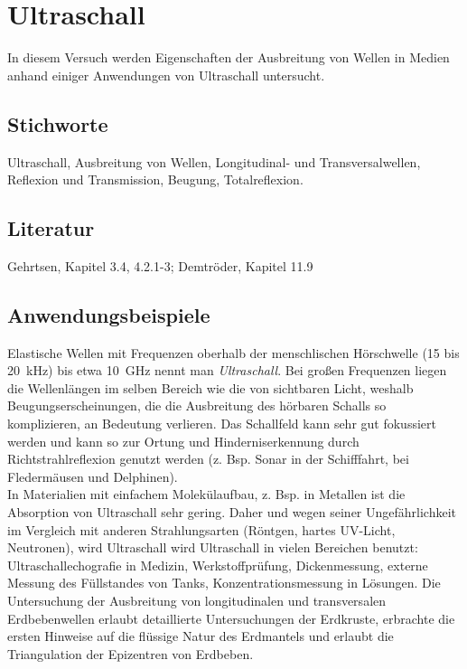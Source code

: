 \chapter{Ultraschall}
\label{vn:2}

In diesem Versuch werden Eigenschaften der Ausbreitung von Wellen in Medien anhand einiger Anwendungen von Ultraschall untersucht.
%
\section{Stichworte}
Ultraschall, Ausbreitung von Wellen, Longitudinal- und Transversalwellen, Reflexion und Transmission, Beugung, Totalreflexion.
%
\section{Literatur}
Gehrtsen, Kapitel 3.4, 4.2.1-3; Demtröder, Kapitel 11.9
%
\section{Anwendungsbeispiele}
%
Elastische Wellen mit Frequenzen oberhalb der menschlischen Hörschwelle (15 bis 20~kHz) bis etwa 10~GHz nennt man \textit{Ultraschall}. Bei großen Frequenzen liegen die Wellenlängen im selben Bereich wie die von sichtbaren Licht, weshalb Beugungserscheinungen, die die Ausbreitung des hörbaren Schalls so komplizieren, an Bedeutung verlieren. Das Schallfeld kann sehr gut fokussiert werden und kann so zur Ortung und Hinderniserkennung durch Richtstrahlreflexion genutzt werden (z. Bsp. Sonar in der Schifffahrt, bei Fledermäusen und Delphinen). \\
In Materialien mit einfachem Molekülaufbau, z. Bsp. in Metallen ist die Absorption von Ultraschall sehr gering. Daher und wegen seiner Ungefährlichkeit im Vergleich mit anderen Strahlungsarten (Röntgen, hartes UV-Licht, Neutronen), wird Ultraschall wird Ultraschall in vielen Bereichen benutzt: Ultraschallechografie in Medizin, Werkstoffprüfung, Dickenmessung, externe Messung des Füllstandes von Tanks, Konzentrationsmessung in Lösungen. Die Untersuchung der Ausbreitung von longitudinalen und transversalen Erdbebenwellen erlaubt detaillierte Untersuchungen der Erdkruste, erbrachte die ersten Hinweise auf die flüssige Natur des Erdmantels und erlaubt die Triangulation der Epizentren von Erdbeben.
%
